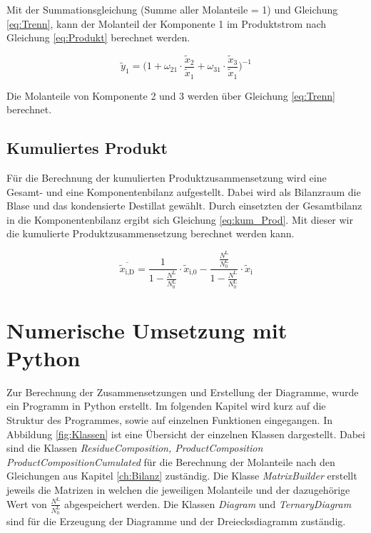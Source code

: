 \noindent Mit der Summationsgleichung (Summe aller Molanteile = 1) und Gleichung \ref{eq:Trenn}, kann der Molanteil der Komponente 1 im Produktstrom nach Gleichung \ref{eq:Produkt} berechnet werden.

\begin{equation}
    \tilde y_1 = \Big( 1 + \omega_{21} \cdot \frac{\tilde x_{2}}{\tilde x_1}  + \omega_{31} \cdot \frac{\tilde x_{3}}{\tilde x_1} \Big) ^{-1}
    \label{eq:Produkt}
\end{equation}

\noindent Die Molanteile von Komponente 2 und 3 werden über Gleichung \ref{eq:Trenn} berechnet.


\subsection{Kumuliertes Produkt}

Für die Berechnung der kumulierten Produktzusammensetzung wird eine Gesamt- und eine Komponentenbilanz aufgestellt. Dabei wird als Bilanzraum die Blase und das kondensierte Destillat gewählt. Durch einsetzten der Gesamtbilanz in die Komponentenbilanz ergibt sich Gleichung \ref{eq:kum_Prod}. Mit dieser wir die kumulierte Produktzusammensetzung berechnet werden kann.

\begin{equation}
    \overline{\tilde x_{\text{i,D}}} = \frac{1}{1 - \frac{N^{\text{L}}}{N^{\text{L}}_0}} \cdot \tilde x_{\text{i,0}} - \frac{\frac{N^{\text{L}}}{N^{\text{L}}_0}}{1 - \frac{N^{\text{L}}}{N^{\text{L}}_0}} \cdot \tilde x_{\text{i}}
    \label{eq:kum_Prod}
\end{equation}


\section{Numerische Umsetzung mit Python}
\label{sec:Pyth}

Zur Berechnung der Zusammensetzungen und Erstellung der Diagramme, wurde ein Programm in Python erstellt. Im folgenden Kapitel wird kurz auf die Struktur des Programmes, sowie auf einzelnen Funktionen eingegangen.
In Abbildung \ref{fig:Klassen} ist eine Übersicht der einzelnen Klassen dargestellt. Dabei sind die Klassen \textit{ResidueComposition,  ProductComposition} \textit{ProductCompositionCumulated} für die Berechnung der Molanteile nach den Gleichungen aus Kapitel \ref{ch:Bilanz} zuständig. Die Klasse \textit{MatrixBuilder} erstellt jeweils die Matrizen in welchen die jeweiligen Molanteile und der dazugehörige Wert von $\frac{N^{\text{L}}}{N_{0}^{\text{L}}}$ abgespeichert werden. Die Klassen \textit{Diagram} und \textit{TernaryDiagram} sind für die Erzeugung der Diagramme und der Dreiecksdiagramm zuständig.

